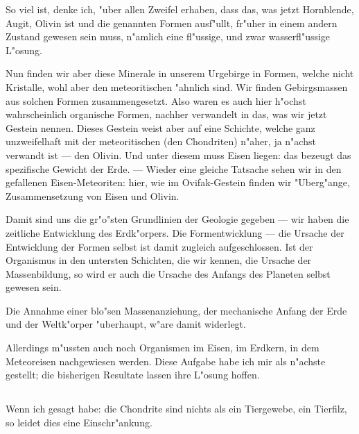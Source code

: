 \documentclass[a4paper, 11pt, oneside]{article}
\begin{document}
So viel ist, denke ich, "uber allen Zweifel erhaben, dass das, was jetzt Hornblende, Augit, Olivin ist und die genannten Formen ausf"ullt, fr"uher in einem andern Zustand gewesen sein muss, n"amlich eine fl"ussige, und zwar wasserfl"ussige L"osung.

Nun finden wir aber diese Minerale in unserem Urgebirge in Formen, welche nicht Kristalle, wohl aber den meteoritischen "ahnlich sind. Wir finden Gebirgsmassen aus solchen Formen zusammengesetzt. Also waren es auch hier h"ochst wahrscheinlich organische Formen, nachher verwandelt in das, was wir jetzt Gestein nennen. Dieses Gestein weist aber auf eine Schichte, welche ganz unzweifelhaft mit der meteoritischen (den Chondriten) n"aher, ja n"achst verwandt ist --- den Olivin. Und unter diesem muss Eisen liegen: das bezeugt das spezifische Gewicht der Erde. --- Wieder eine gleiche Tatsache sehen wir in den gefallenen Eisen-Meteoriten: hier, wie im Ovifak-Gestein finden wir "Uberg"ange, Zusammensetzung von Eisen und Olivin.

Damit sind uns die gr"o"sten Grundlinien der Geologie gegeben --- wir haben die zeitliche Entwicklung des Erdk"orpers. Die Formentwicklung --- die Ursache der Entwicklung der Formen selbst ist damit zugleich aufgeschlossen. Ist der Organismus in den untersten Schichten, die wir kennen, die Ursache der Massenbildung, so wird er auch die Ursache des Anfangs des Planeten selbst gewesen sein.

Die Annahme einer blo"sen Massenanziehung, der mechanische Anfang der Erde und der Weltk"orper "uberhaupt, w"are damit widerlegt.

Allerdings m"ussten auch noch Organismen im Eisen, im Erdkern, in dem Meteoreisen nachgewiesen werden. Diese Aufgabe habe ich mir als n"achste gestellt; die bisherigen Resultate lassen ihre L"osung hoffen.
\clearpage
\subsection{}
\paragraph{}
Wenn ich gesagt habe: die Chondrite sind nichts als ein Tiergewebe, ein Tierfilz, so leidet dies eine Einschr"ankung.
\end{document}
